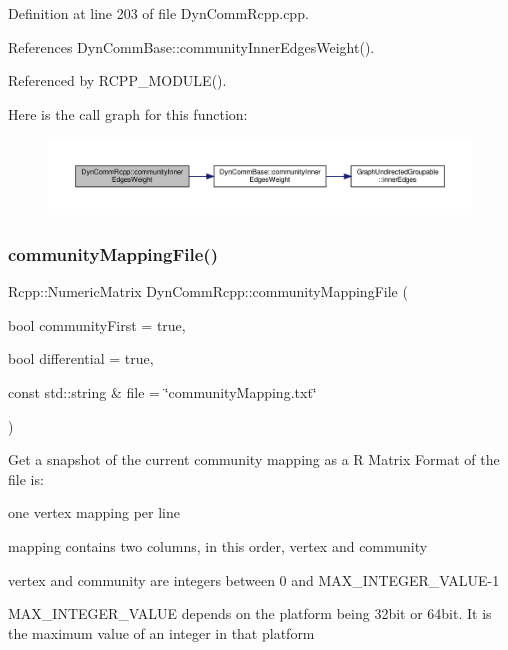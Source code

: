 Definition at line 203 of file Dyn\+Comm\+Rcpp.\+cpp.



References Dyn\+Comm\+Base\+::community\+Inner\+Edges\+Weight().



Referenced by R\+C\+P\+P\+\_\+\+M\+O\+D\+U\+L\+E().

Here is the call graph for this function\+:\nopagebreak
\begin{figure}[H]
\begin{center}
\leavevmode
\includegraphics[width=350pt]{classDynCommRcpp_aed6b4f1e844956429eb9a15d8d6df7b6_cgraph}
\end{center}
\end{figure}
\mbox{\label{classDynCommRcpp_a132aff4ca6f76fd006b2faccbfd01e04}} 
\subsubsection{\texorpdfstring{community\+Mapping\+File()}{communityMappingFile()}}
{\footnotesize\ttfamily Rcpp\+::\+Numeric\+Matrix Dyn\+Comm\+Rcpp\+::community\+Mapping\+File (\begin{DoxyParamCaption}\item[{bool}]{community\+First = {\ttfamily true},  }\item[{bool}]{differential = {\ttfamily true},  }\item[{const std\+::string \&}]{file = {\ttfamily \char`\"{}communityMapping.txt\char`\"{}} }\end{DoxyParamCaption})\hspace{0.3cm}{\ttfamily [inline]}}

Get a snapshot of the current community mapping as a R Matrix Format of the file is\+:
\begin{DoxyItemize}
\item one vertex mapping per line
\item mapping contains two columns, in this order, vertex and community
\item vertex and community are integers between 0 and M\+A\+X\+\_\+\+I\+N\+T\+E\+G\+E\+R\+\_\+\+V\+A\+L\+U\+E-\/1
\item M\+A\+X\+\_\+\+I\+N\+T\+E\+G\+E\+R\+\_\+\+V\+A\+L\+UE depends on the platform being 32bit or 64bit. It is the maximum value of an integer in that platform 
\end{DoxyItemize}

